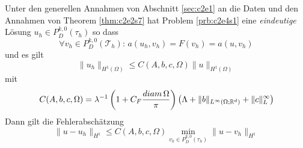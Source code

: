 \documentclass[../skript.tex]{subfiles}
\begin{document}
 \begin{theorem}\label{thm:c2e4s1}
 	Unter den generellen Annahmen von Abschnitt \cref{sec:c2e1} an die Daten und den Annahmen von Theorem \cref{thm:c2e2s7} hat Problem \cref{prb:c2e4s1} eine \emph{eindeutige} Lösung $u_h\in P^{k,0}_D(\tau_h)$ so dass
 	\[
 		\forall v_h\in P^{k,0}_D(\mathcal{T}_h):\,a(u_h,v_h) = F(v_h) = a(u,v_h)
 	\]
 	und es gilt
 	\[
 		\|u_h\|_{H^1(\Omega)}\leq C(A,b,c,\Omega)\|u\|_{H^1(\Omega)} 
 	\]
 	mit 
 	\[
 		C(A,b,c,\Omega) = \lambda^{-1}\left( 1+C_F\frac{diam\,\Omega}{\pi} \right) \left(\Lambda + \|b\|_{L^\infty(\Omega;\mathbb{R}^d)}+\|c\|_L^\infty\right)
 	\]
 	Dann gilt die Fehlerabschätzung
 	\[
 		\|u-u_h\|_{H^1}\leq C(A,b,c,\Omega)\min_{v_k\in P^{k,0}_D(\tau_h)}\|u-v_h\|_{H^1}
 	\]

 \end{theorem}
\end{document}
